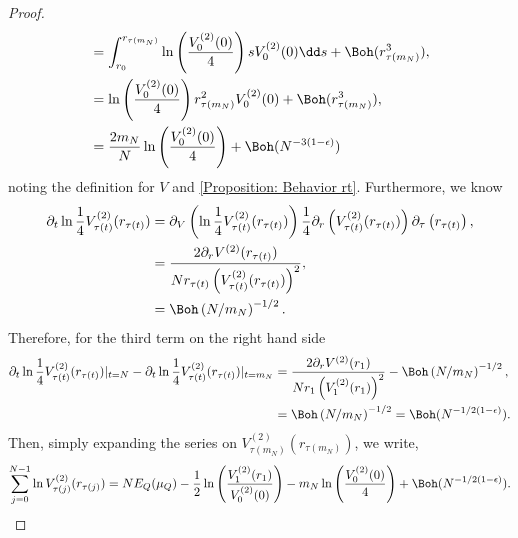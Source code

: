 \begin{proof}
\begin{align}
		& = \int_{r_0}^{r_{\tau(m_N)}} \ln\left( \frac{V^{(2)}_0(0)}{4} \right) s V^{(2)}_0(0)  \dd s + \Boh(r_{\tau(m_N)}^3), \\
		& =  \ln\left( \frac{V^{(2)}_0(0)}{4} \right) r_{\tau(m_N)}^2 V^{(2)}_0(0) + \Boh(r_{\tau(m_N)}^3), \\
		& = \frac{2m_N}{N}\ln\left( \frac{V^{(2)}_0(0)}{4} \right)  + \Boh(N^{-3(1-\epsilon)}) 
	\end{align}
	noting the definition for $V$ and \autoref{Proposition: Behavior rt}. Furthermore, we know 
	\begin{align}
		\partial_t \ln \frac{1}{4}V^{(2)}_{\tau(t)}(r_{\tau(t)}) & = \partial_V \left( \ln \frac{1}{4} V^{(2)}_{\tau(t)}(r_{\tau(t)}) \right)  \frac{1}{4}  \partial_r \left( V^{(2)}_{\tau(t)}(r_{\tau(t)}) \right) \partial_\tau \left( r_{\tau(t)} \right), \\
		& = \frac{2 \partial_r V^{(2)} (r_{\tau(t)})}{ N r_{\tau(t)} \left( V^{(2)}_{\tau(t)}(r_{\tau(t)})\right)^2}, \\
		& = \Boh\left( N/m_N \right)^{-1/2}.
	\end{align}
	Therefore, for the third term on the right hand side
	\begin{align}
		\partial_t \ln \frac{1}{4} V^{(2)}_{\tau(t)}(r_{\tau(t)}) |_{t=N} - \partial_t \ln \frac{1}{4} V^{(2)}_{\tau(t)}(r_{\tau(t)}) |_{t=m_N} & = \frac{2 \partial_r V^{(2)}(r_{1})}{ N r_1 \left( V^{(2)}_1(r_1)\right)^2} - \Boh\left( N/m_N \right)^{-1/2}, \\ 
		& =\Boh\left( N/m_N \right)^{-1/2} = \Boh(N^{-1/2(1-\epsilon)}).
	\end{align}
	Then, simply expanding the series on $V^{(2)}_{\tau(m_N)}(r_{\tau(m_N)})$, we write,
	\begin{equation}
		\sum_{j=0}^{N-1}  \ln V^{(2)}_{\tau(j)}(r_{\tau(j)})  = N E_Q(\mu_Q)  - \frac{1}{2} \ln \left( \frac{V^{(2)}_{1}(r_1)}{V^{(2)}_{0}(0)} \right) - m_N \ln\left(  \frac{V^{(2)}_0(0)}{4} \right)  + \Boh(N^{-1/2(1-\epsilon)}).
		\label{Equation: logV annulus}
	\end{equation}
\end{proof}

